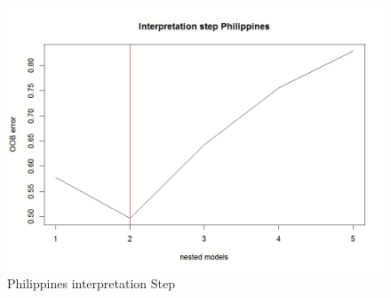 \documentclass[12pt,a4paper,english]{article}
\begin{document}
\FloatBarrier
\begin{figure}[!htb]
\begin{center}
\includegraphics[scale=0.50]{F6.jpg}
\caption{Philippines interpretation Step}
\label{figure17}
\end{center}
\end{figure}
\FloatBarrier
\end{document}
